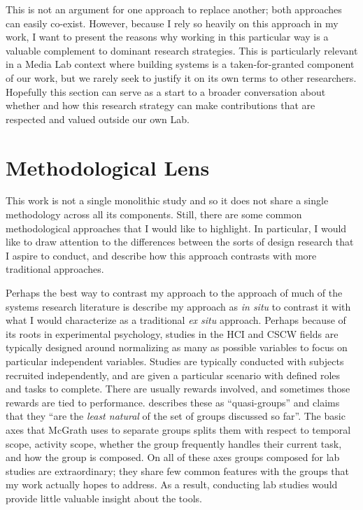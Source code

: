 This is not an argument for one approach to replace another; both approaches can easily co-exist. However, because I rely so heavily on this approach in my work, I want to present the reasons why working in this particular way is a valuable complement to dominant research strategies. This is particularly relevant in a Media Lab context where building systems is a taken-for-granted component of our work, but we rarely seek to justify it on its own terms to other researchers. Hopefully this section can serve as a start to a broader conversation about whether and how this research strategy can make contributions that are respected and valued outside our own Lab.

\section{Methodological Lens}



This work is not a single monolithic study and so it does not share a single methodology across all its components. Still, there are some common methodological approaches that I would like to highlight. In particular, I would like to draw attention to the differences between the sorts of design research that I aspire to conduct, and describe how this approach contrasts with more traditional approaches. 

Perhaps the best way to contrast my approach to the approach of much of the systems research literature is describe my approach as \emph{in situ} to contrast it with what I would characterize as a traditional \emph{ex situ} approach. Perhaps because of its roots in experimental psychology, studies in the HCI and CSCW fields are typically designed around normalizing as many as possible variables to focus on particular independent variables. Studies are typically conducted with subjects recruited independently, and are given a particular scenario with defined roles and tasks to complete. There are usually rewards involved, and sometimes those rewards are tied to performance. \citet{McGrath:1984un} describes these as ``quasi-groups'' and claims that they ``are the \emph{least natural} of the set of groups discussed so far''. The basic axes that McGrath uses to separate groups splits them with respect to temporal scope, activity scope, whether the group frequently handles their current task, and how the group is composed. On all of these axes groups composed for lab studies are extraordinary; they share few common features with the groups that my work actually hopes to address. As a result, conducting lab studies would provide little valuable insight about the tools.


